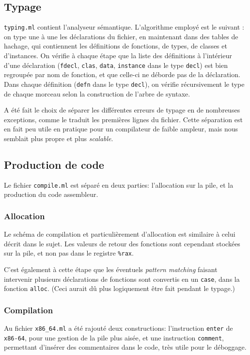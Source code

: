 \documentclass[12pt,a4paper]{article}
\begin{document}
\subsection{Typage}
\texttt{typing.ml} contient l'analyseur sémantique. L'algorithme employé est le suivant : on type une à une les déclarations du fichier, en maintenant dans des tables de hachage, qui contiennent les définitions de fonctions, de types, de classes et d'instances. On vérifie à chaque étape que la liste des définitions à l'intérieur d'une déclaration (\texttt{fdecl}, \texttt{clas}, \texttt{data}, \texttt{instance} dans le type \texttt{decl}) est bien regroupée par nom de fonction, et que celle-ci ne déborde pas de la déclaration. Dans chaque définition (\texttt{defn} dans le type \texttt{decl}), on vérifie récursivement le type de chaque morceau selon la construction de l'arbre de syntaxe. 

A été fait le choix de séparer les différentes erreurs de typage en de nombreuses exceptions, comme le traduit les premières lignes du fichier. Cette séparation est en fait peu utile en pratique pour un compilateur de faible ampleur, mais nous semblait plus propre et plus \emph{scalable}.

\subsection{Production de code}
Le fichier \texttt{compile.ml} est séparé en deux parties: l'allocation sur la pile, et la production du code assembleur.  

\subsubsection{Allocation}
Le schéma de compilation et particulièrement d'allocation est similaire à celui décrit dans le sujet. Les valeurs de retour des fonctions sont cependant stockées sur la pile, et non pas dans le registre \texttt{\%rax}.

C'est également à cette étape que les éventuels \emph{pattern matching} faisant intervenir plusieurs déclarations de fonctions sont convertis en un \texttt{case}, dans la fonction \texttt{alloc}. (Ceci aurait dû plus logiquement être fait pendant le typage.)

\subsubsection{Compilation}
Au fichier \texttt{x86\_64.ml} a été rajouté deux constructions: l'instruction \texttt{enter} de \texttt{x86-64}, pour une gestion de la pile plus aisée, et une instruction \texttt{comment}, permettant d'insérer des commentaires dans le code, très utile pour le déboggage. 
\end{document}
